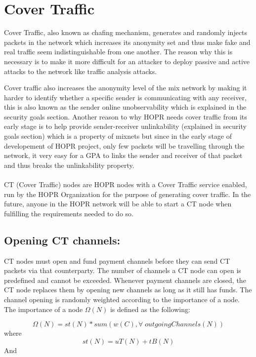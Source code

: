 \section{Cover Traffic}


Cover Traffic, also known as chafing mechanism, generates and randomly injects packets in the network which increases its anonymity set and thus make fake and real traffic seem indistinguishable from one another. The reason why this is necessary is to make it more difficult for an attacker to deploy passive and active attacks to the network like traffic analysis attacks.

Cover traffic also increases the anonymity level of the mix network by making it harder to identify whether a specific sender is communicating with any receiver, this is also known as the sender online unobservability which is explained in the security goals section.
Another reason to why HOPR needs cover traffic from its early stage is to help provide sender-receiver unlinkability (explained in security goals section) which is a property of mixnets but since in the early stage of developement of HOPR project, only few packets will be travelling through the network, it very easy for a GPA to links the sender and receiver of that packet and thus breaks the unlinkability property.
\\~\\ CT (Cover Traffic) nodes are HOPR nodes with a Cover Traffic service enabled, run by the HOPR Organization for the purpose of generating cover traffic. In the future, anyone in the HOPR network will be able to start a CT node when fulfilling the requirements needed to do so.
\subsection{Opening CT channels:} 
CT nodes must open and fund payment channels before they can send CT packets via that counterparty. The number of channels a CT node can open is predefined and cannot be exceeded. Whenever payment channels are closed, the CT node replaces them by opening new channels as long as it still has funds. 
The channel opening is randomly weighted according to the importance of a node. The importance of a node $\Omega(N)$ is defined as the following:

$$\Omega(N) = st(N) * sum(w(C), \forall \; outgoingChannels(N))$$
where 
$$st(N) = uT(N) + tB(N)$$
And 


